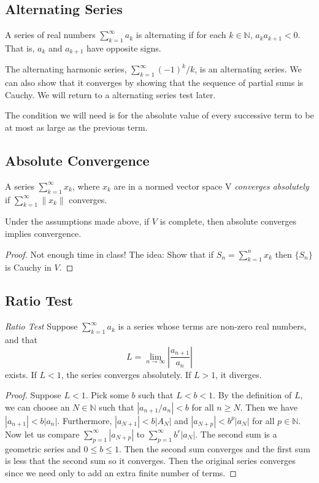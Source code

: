 \documentclass[11pt]{article}
\theoremstyle{definition}
\newcommand{\N}{\mathbb{N}}
\begin{document}
\subsection{Alternating Series}
 A series of real numbers $\sum_{k=1}^\infty a_k$ is alternating if for each $k\in \N$, $a_ka_{k+1}<0$. That is, $a_k$ and $a_{k+1}$ have opposite signs.

\ex The alternating harmonic series, $\sum_{k=1}^\infty (-1)^k/k$, is an alternating series. We can also show that it converges by showing that the sequence of partial sums is Cauchy. We will return to a alternating series test later.

The condition we will need is for the absolute value of every successive term to be at most as large as the previous term.

\subsection{Absolute Convergence}
 A series $\sum_{k=1}^\infty x_k$, where $x_k$ are in a normed vector space V \textit{converges absolutely} if $\sum_{k=1}^\infty \|x_k\|$ converges.

\prop Under the assumptions made above, if $V$ is complete, then absolute converges implies convergence.

\begin{proof}
    Not enough time in class! The idea: Show that if $S_n=\sum_{k=1}^n x_k$ then $\{S_n\}$ is Cauchy in $V$.
\end{proof}

\subsection{Ratio Test}
\prop \textit{Ratio Test} Suppose $\sum_{k=1}^\infty a_k$ is a series whose terms are non-zero real numbers, and that
$$
L=\lim_{n\to\infty}\left| \frac{a_{n+1}}{a_n} \right|
$$
exists. If $L<1$, the series converges absolutely. If $L>1$, it diverges.

\begin{proof}
    Suppose $L<1$. Pick some $b$ such that $L<b<1$. By the definition of $L$, we can choose an $N\in \N$ such that $|a_{n+1}/a_n|<b$ for all $n\geq N$. Then we have $|a_{n+1}|<b|a_n|$. Furthermore, $|a_{N+1}|<b|A_N|$ and $|a_{N+p}|<b^p|a_N|$ for all $p\in \N$. Now let us compare $\sum_{p=1}^\infty |a_{N+p}|$ to $\sum_{p=1}^\infty b^r|a_N|$. The second sum is a geometric series and $0\leq b\leq 1$. Then the second sum converges and the first sum is less that the second sum so it converges. Then the original series converges since we need only to add an extra finite number of terms.
\end{proof}
\end{document}
